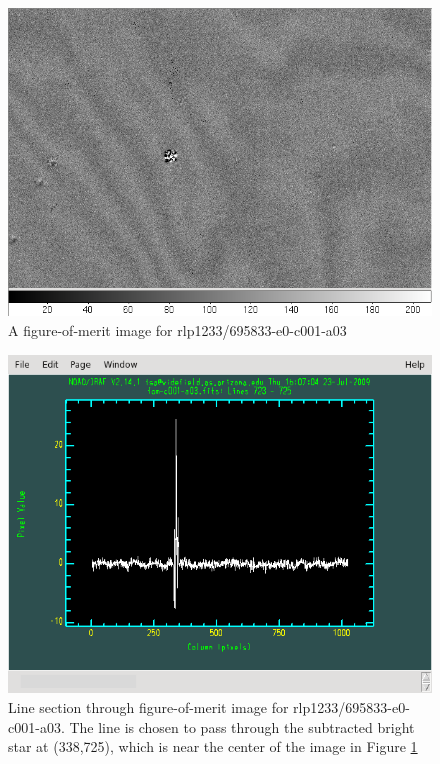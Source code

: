 \begin{figure}[htb]
\begin{center}
\includegraphics[width=6in]{images/rlp1233_v695833-e0-c001-a03-fom_img.png}
\caption{A figure-of-merit image for
  rlp1233/695833-e0-c001-a03}  
\label{fig:diffim2}
\end{center}
\end{figure}

\begin{figure}[htb]
\begin{center}
\includegraphics[width=6in]{images/rlp1233_v695833-e0-c001-a03-fom_plot.png}
\caption{Line section through figure-of-merit image for
  rlp1233/695833-e0-c001-a03.  The line is chosen to pass through the
  subtracted bright star at (338,725), which is near the center of the
image in Figure \ref{fig:diffim2}}  
\label{fig:diffim3}
\end{center}
\end{figure}

